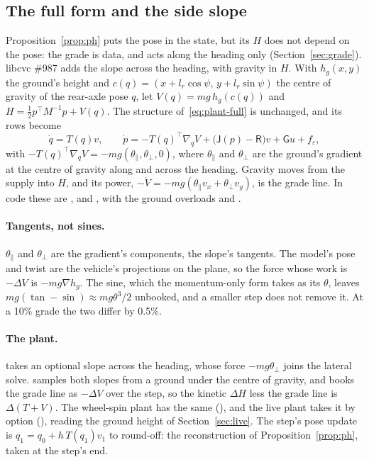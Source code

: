 \documentclass[11pt]{article}
\theoremstyle{remark}
\newcommand{\J}{\mathsf J}
\newcommand{\R}{\mathsf R}
\newcommand{\G}{\mathsf G}
\newcommand{\T}{^{\top}}
\begin{document}
\subsection{The full form and the side slope}
\label{sec:full}
Proposition~\ref{prop:ph} puts the pose in the state, but its $H$ does not depend on the pose: the
grade is data, and acts along the heading only (Section~\ref{sec:grade}). libcvc \#987 adds the
slope across the heading, with gravity in $H$. With $h_g(x,y)$ the ground's height and
$c(q)=(x+l_r\cos\psi,\,y+l_r\sin\psi)$ the centre of gravity of the rear-axle pose $q$, let
$V(q)=mg\,h_g(c(q))$ and $H=\tfrac12p\T M^{-1}p+V(q)$. The structure of~\eqref{eq:plant-full} is
unchanged, and its rows become
\begin{equation}
  \dot q=T(q)v,\qquad \dot p=-T(q)\T\nabla_qV+\big(\J(p)-\R\big)v+\G u+f_\varepsilon,
  \label{eq:plant-ground}
\end{equation}
with $-T(q)\T\nabla_qV=-mg(\theta_\parallel,\theta_\perp,0)$, where $\theta_\parallel$ and
$\theta_\perp$ are the ground's gradient at the centre of gravity along and across the heading.
Gravity moves from the supply into $H$, and its power, $-\dot V=-mg(\theta_\parallel v_x+
\theta_\perp v_y)$, is the grade line. In code these are , 
and , with the ground overloads  and
.

\paragraph{Tangents, not sines.} $\theta_\parallel$ and $\theta_\perp$ are the gradient's
components, the slope's tangents. The model's pose and twist are the vehicle's projections on the
plane, so the force whose work is $-\Delta V$ is $-mg\nabla h_g$. The sine, which the momentum-only
form takes as its $\theta$, leaves $mg(\tan-\sin)\approx mg\theta^3/2$ unbooked, and a smaller step
does not remove it. At a 10\% grade the two differ by 0.5\%.

\paragraph{The plant.}  takes an optional slope across the heading, whose force
$-mg\theta_\perp$ joins the lateral solve.  samples both slopes from a
ground under the centre of gravity, and  books the grade line as
$-\Delta V$ over the step, so the kinetic $\Delta H$ less the grade line is $\Delta(T+V)$. The
wheel-spin plant has the same (), and the live plant takes it by
option (), reading the ground height of
Section~\ref{sec:live}. The step's pose update is $q_1=q_0+h\,T(q_1)v_1$ to round-off: the
reconstruction of Proposition~\ref{prop:ph}, taken at the step's end.
\end{document}
